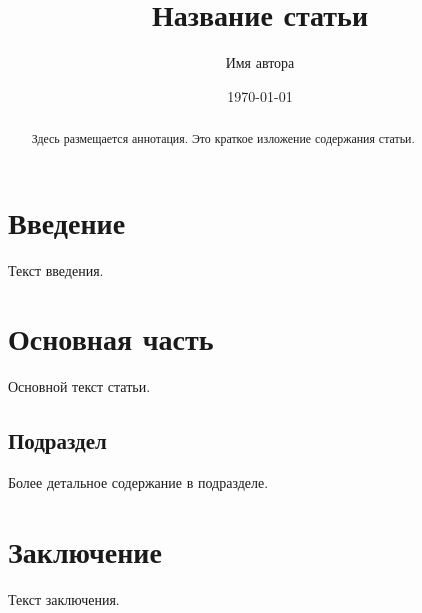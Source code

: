 \documentclass[12pt]{article}    %
\title{Название статьи}
\author{Имя автора}
\date{\today}
\begin{document}
\maketitle

\begin{abstract}
Здесь размещается аннотация. Это краткое изложение содержания статьи.
\end{abstract}


\section{Введение}

Текст введения.

\section{Основная часть}

Основной текст статьи.

\subsection{Подраздел}

Более детальное содержание в подразделе.

\section{Заключение}

Текст заключения.


\end{document}
